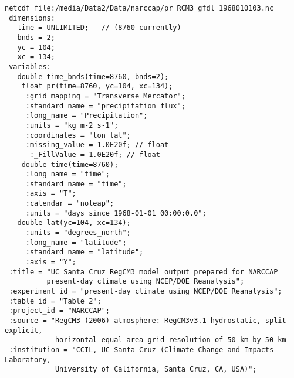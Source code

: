 \documentclass{beamer}
\begin{document}
\begin{frame}[fragile]
\tiny
\begin{verbatim}
netcdf file:/media/Data2/Data/narccap/pr_RCM3_gfdl_1968010103.nc
 dimensions:
   time = UNLIMITED;   // (8760 currently)
   bnds = 2;
   yc = 104;
   xc = 134;
 variables:
   double time_bnds(time=8760, bnds=2);
    float pr(time=8760, yc=104, xc=134);
     :grid_mapping = "Transverse_Mercator";
     :standard_name = "precipitation_flux";
     :long_name = "Precipitation";
     :units = "kg m-2 s-1";
     :coordinates = "lon lat";
     :missing_value = 1.0E20f; // float
      :_FillValue = 1.0E20f; // float
    double time(time=8760);
     :long_name = "time";
     :standard_name = "time";
     :axis = "T";
     :calendar = "noleap";
     :units = "days since 1968-01-01 00:00:0.0";
   double lat(yc=104, xc=134);
     :units = "degrees_north";
     :long_name = "latitude";
     :standard_name = "latitude";
     :axis = "Y";
 :title = "UC Santa Cruz RegCM3 model output prepared for NARCCAP
          present-day climate using NCEP/DOE Reanalysis";
 :experiment_id = "present-day climate using NCEP/DOE Reanalysis";
 :table_id = "Table 2";
 :project_id = "NARCCAP";
 :source = "RegCM3 (2006) atmosphere: RegCM3v3.1 hydrostatic, split-explicit, 
            horizontal equal area grid resolution of 50 km by 50 km
 :institution = "CCIL, UC Santa Cruz (Climate Change and Impacts Laboratory, 
            University of California, Santa Cruz, CA, USA)";

\end{verbatim}
\end{frame}
\end{document}
